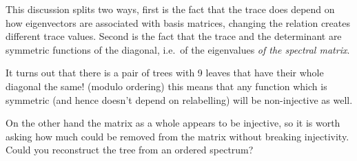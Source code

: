 \documentclass{report}
\begin{document}
This discussion splits two ways, first is the fact that the trace does depend
on how eigenvectors are associated with basis matrices, changing the relation
creates different trace values.
Second is the fact that the trace and the determinant are symmetric functions
of the diagonal, i.e.\ of the eigenvalues \emph{of the spectral matrix}.

It turns out that there is a pair of trees with 9 leaves that have their whole
diagonal the same! (modulo ordering)
this means that any function which is symmetric (and hence doesn't depend on
relabelling) will be non-injective as well.

On the other hand the matrix as a whole appears to be injective, so it is worth
asking how much could be removed from the matrix without breaking injectivity.
Could you reconstruct the tree from an ordered spectrum?
\end{document}
